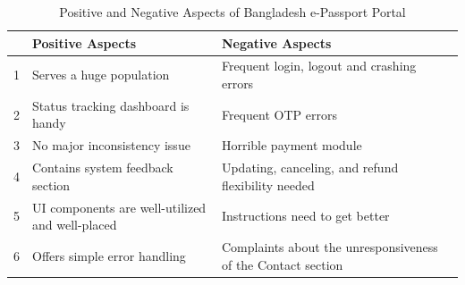 \begin{table}[ht]
\centering
\caption{Positive and Negative Aspects of Bangladesh e-Passport Portal}
\label{tab:summary}
\begin{tabular}{cll}
\hline

\textbf{}&\textbf{Positive Aspects} & \textbf{Negative Aspects} \\\hline
1& Serves a huge population & Frequent login, logout and crashing errors\\
2&Status tracking dashboard is handy & Frequent OTP errors \\
3&No major inconsistency issue& Horrible payment module \\
4&Contains system feedback section & Updating, canceling, and refund flexibility needed \\
5&UI components are well-utilized and well-placed& Instructions need to get better \\
6&Offers simple error handling & Complaints about the unresponsiveness of the Contact section\\\hline
\end{tabular}
\end{table}